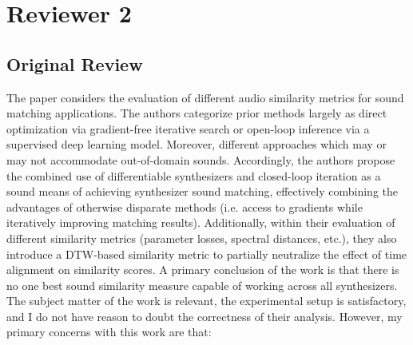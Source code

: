 \documentclass[11pt]{article}
\begin{document}
\section{Reviewer 2}
\subsection{Original Review}
\noindent
The paper considers the evaluation of different audio similarity metrics for sound matching applications.  The authors categorize prior methods largely as direct optimization via gradient-free iterative search or open-loop inference via a supervised deep learning model.  Moreover, different approaches which may or may not accommodate out-of-domain sounds.  Accordingly, the authors propose the combined use of differentiable synthesizers and closed-loop iteration as a sound means of achieving synthesizer sound matching, effectively combining the advantages of otherwise disparate methods (i.e. access to gradients while iteratively improving matching results).  Additionally, within their evaluation of different similarity metrics (parameter losses, spectral distances, etc.), they also introduce a DTW-based similarity metric to partially neutralize the effect of time alignment on similarity scores.  A primary conclusion of the work is that there is no one best sound similarity measure capable of working across all synthesizers.  \\
The subject matter of the work is relevant, the experimental setup is satisfactory, and I do not have reason to doubt the correctness of their analysis.  However, my primary concerns with this work are that:  
\end{document}
